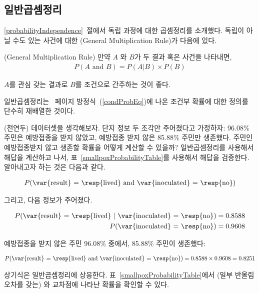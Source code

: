\subsection{일반곱셈정리}

\ref{probabilityIndependence}~절에서 독립 과정에 대한 곱셈정리를 소개했다. 독립이 아닐 수도 있는 사건에 대한 (General Multiplication Rule)가 다음에 있다.

\begin{termBox}{(General Multiplication Rule)
만약 $A$ 와 $B$가 두 결과 혹은 사건을 나타내면, \vspace{-1.5mm}
\begin{eqnarray*}
P(A\text{ and }B) = P(A | B)\times P(B)
\end{eqnarray*} \vspace{-6.5mm} \par
$A$를 관심 갖는 결과로 $B$를 조건으로 간주하는 것이 좋다.}
\end{termBox}
일반곱셈정리는 \pageref{condProbEq}~페이지 방정식~(\ref{condProbEq})에 나온 조건부 확률에 대한 정의를 단수히 재배열한 것이다.

\begin{example}{ (천연두) 데이터셋을 생각해보자. 단지 정보 두 조각만 주어졌다고 가정하자: 96.08\% 주민은 예방접종을 받지 않았고, 예방접종 받지 않은 85.88\% 주민만 생존했다. 주민인 예방접종받지 않고 생존할 확률을 어떻게 계산할 수 있을까?}
일반곱셈정리를 사용해서 해답을 계산하고 나서, 표~\ref{smallpoxProbabilityTable}를 사용해서 해답을 검증한다. 알아내고자 하는 것은 다음과 같다.

\begin{eqnarray*}
P(\text{\var{result} = \resp{lived} and \var{inoculated} = \resp{no}})
\end{eqnarray*}

그리고, 다음 정보가 주어졌다.

\begin{eqnarray*}
P(\text{\var{result} = \resp{lived} }|\text{ \var{inoculated} = \resp{no}})=0.8588 \\
P(\text{\var{inoculated} = \resp{no}})=0.9608
\end{eqnarray*}

예방접종을 받지 않은 주민 96.08\% 중에서, 85.88\% 주민이 생존했다:

\begin{eqnarray*}
P(\text{\var{result} = \resp{lived} and \var{inoculated} = \resp{no}}) = 0.8588\times 0.9608 = 0.8251
\end{eqnarray*}

상기식은 일반곱셈정리에 상응한다. 표~\ref{smallpoxProbabilityTable}에서 (일부 반올림 오차를 갖는)  와  교차점에 나타난 확률을 확인할 수 있다.
\end{example}

